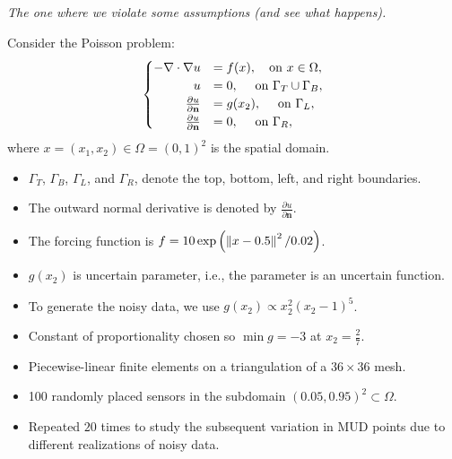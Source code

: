 \begin{frame}{\it The one where we violate some assumptions (and see what happens).}

Consider the Poisson problem:
\begin{equation}\label{eq:pde-equation}
\begin{cases}
\hfill -\nabla \cdot \nabla u &= f(x), \quad\text{on } x\in \Omega, \\
\hfill u &= 0, \quad\text{ on } \Gamma_T \cup \Gamma_B, \\
\hfill \frac{\partial u}{\partial \mathbf{n}} &= g(x_2), \quad\text{ on } \Gamma_L, \\
\hfill \frac{\partial u}{\partial \mathbf{n}} &= 0, \quad\text{ on } \Gamma_R,
\end{cases}
\end{equation}
where $x=(x_1, x_2) \in \Omega = (0,1)^2$ is the spatial domain.

\bigskip
\begin{itemize}
\item $\Gamma_T$, $\Gamma_B$, $\Gamma_L$, and $\Gamma_R$, denote the top, bottom, left, and right boundaries.
\bigskip
\item The outward normal derivative is denoted by $\frac{\partial u}{\partial \mathbf{n}}$.
\bigskip
\item The forcing function is $f = 10\exp\left ( \left\Vert x - 0.5\right\Vert^2 / 0.02 \right )$.
\end{itemize}

\end{frame}


\begin{frame}

\begin{itemize}

\item $g(x_2)$ is uncertain parameter, i.e., the parameter is an uncertain function.
\bigskip
\item To generate the noisy data, we use $g(x_2)\propto x_2^2(x_2-1)^5$.
\bigskip
\item Constant of proportionality chosen so $\min{g}=-3$ at $x_2=\frac{2}{7}$.
\bigskip
\item Piecewise-linear finite elements on a triangulation of a $36\times36$ mesh.
\bigskip
\item 100 randomly placed sensors in the subdomain $(0.05, 0.95)^2 \subset \Omega$.
\bigskip
\item Repeated $20$ times to study the subsequent variation in MUD points due to different realizations of noisy data.
\bigskip
\end{itemize}

\end{frame}


